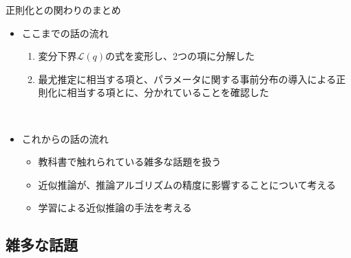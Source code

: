 \documentclass[dvipdfmx,notheorems,t]{beamer}
\begin{document}
\begin{frame}{正則化との関わりのまとめ}

\begin{itemize}
	\item ここまでの話の流れ
	\begin{enumerate}
		\item 変分下界$\mathcal{L}(q)$の式を変形し、2つの項に分解した
		\item 最尤推定に相当する項と、パラメータに関する事前分布の導入による\alert{正則化}に相当する項とに、分かれていることを確認した
	\end{enumerate} \
	
	\item これからの話の流れ
	\begin{itemize}
		\item 教科書で触れられている雑多な話題を扱う
		\newline
		\item 近似推論が、推論アルゴリズムの精度に影響することについて考える
		\item 学習による近似推論の手法を考える
	\end{itemize}
\end{itemize}

\end{frame}

\subsection{雑多な話題}
\end{document}
